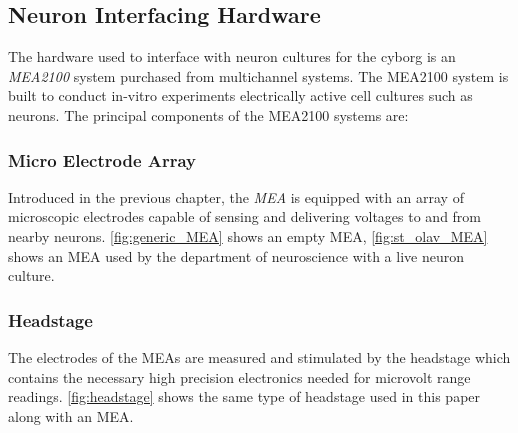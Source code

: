 \subsection{Neuron Interfacing Hardware}
The hardware used to interface with neuron cultures for the cyborg is an
\textit{MEA2100} system purchased from multichannel systems. 
The MEA2100 system is built to conduct in-vitro experiments electrically active
cell cultures such as neurons.
The principal components of the MEA2100 systems are:
\subsubsection{Micro Electrode Array}
Introduced in the previous chapter, the \textit{MEA} is equipped with an array
of microscopic electrodes capable of sensing and delivering voltages to and from
nearby neurons.
\ref{fig:generic_MEA} shows an empty MEA,
\ref{fig:st_olav_MEA} shows an MEA used by the department of neuroscience with a live neuron culture.
\subsubsection{Headstage}
The electrodes of the MEAs are measured and stimulated by the headstage which
contains the necessary high precision electronics needed for microvolt range readings.
\ref{fig:headstage} shows the same type of headstage used in this paper along
with an MEA.
